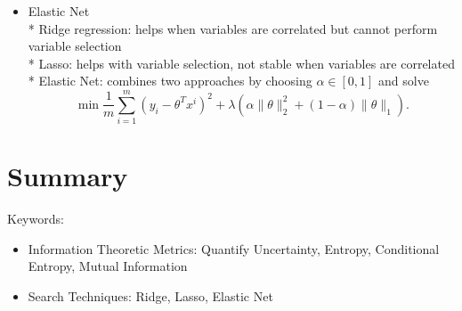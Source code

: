 \documentclass[twoside,12pt]{article}
\begin{document}
\begin{itemize}
\item Elastic Net\\
* Ridge regression: helps when variables are correlated but cannot perform variable selection \\
* Lasso: helps with variable selection, not stable when variables are correlated \\
* Elastic Net: combines two approaches by choosing $\alpha \in [0, 1]$ and solve 
$$\min \frac 1 m \sum_{i=1}^m (y_i - \theta^T x^i)^2 + \lambda (\alpha \|\theta\|_2^2 + (1-\alpha)\|\theta\|_1).$$
\end{itemize}


\section{Summary}
Keywords:
\begin{itemize}
\item Information Theoretic Metrics: Quantify Uncertainty, Entropy, Conditional Entropy, Mutual Information 
\item Search Techniques: Ridge, Lasso, Elastic Net
\end{itemize}
\end{document}
